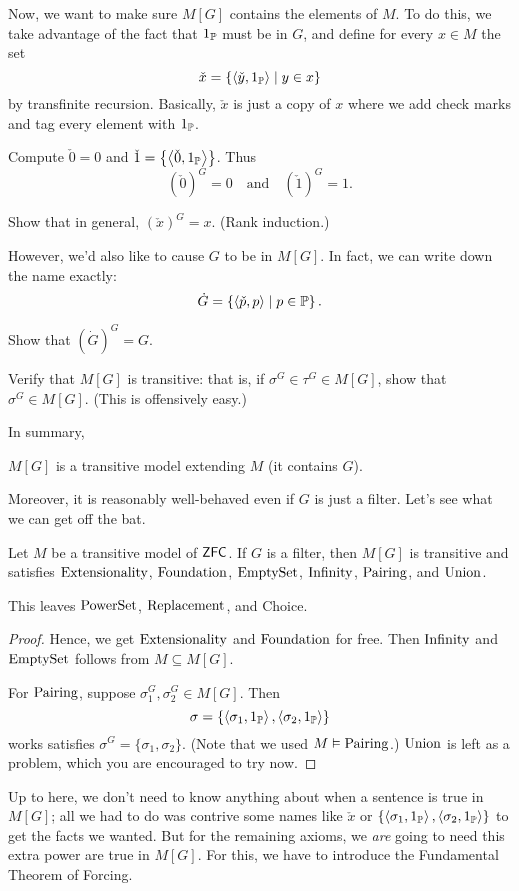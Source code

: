 Now, we want to make sure $M[G]$ contains the elements of $M$.
To do this, we take advantage of the fact that $1_\mathbb P$ must be in $G$, and define
for every $x \in M$ the set
\[ \check x = \left\{ \left<\check y, 1_\mathbb P\right> \mid y \in x \right\} \]
by transfinite recursion.
Basically, $\check x$ is just a copy of $x$ where we add check marks and tag every element with $1_\mathbb P$.

\begin{example}
	Compute $\check 0 = 0$ and $\check 1 = \left\{ \left<\check 0, 1_\mathbb P\right> \right\}$.
	Thus \[ (\check 0)^G = 0 \quad\text{and}\quad (\check 1)^G = 1. \]
\end{example}
\begin{ques}
	Show that in general, $(\check x)^G = x$.
	(Rank induction.)
\end{ques}

However, we'd also like to cause $G$ to be in $M[G]$.
In fact, we can write down the name exactly:
\[ \dot G = \left\{ \left<\check p, p\right> \mid p \in \mathbb P \right\}. \]
\begin{ques}
	Show that $(\dot G)^G = G$.
\end{ques}
\begin{ques}
	Verify that $M[G]$ is transitive:
	that is, if $\sigma^G \in \tau^G \in M[G]$, show that $\sigma^G \in M[G]$.
	(This is offensively easy.)
\end{ques}

In summary,
\begin{moral}
	$M[G]$ is a transitive model extending $M$ (it contains $G$).
\end{moral}

Moreover, it is reasonably well-behaved even if $G$ is just a filter.
Let's see what we can get off the bat.
\begin{lemma}
	Let $M$ be a transitive model of $\mathsf{ZFC}$.
	If $G$ is a filter, then $M[G]$ is transitive
	and satisfies $\mathrm{Extensionality}$, $\mathrm{Foundation}$, 
	$\mathrm{EmptySet}$, $\mathrm{Infinity}$, $\mathrm{Pairing}$, and $\mathrm{Union}$.
\end{lemma}

This leaves $\mathrm{PowerSet}$, $\mathrm{Replacement}$, and Choice.
\begin{proof}
	Hence, we get $\mathrm{Extensionality}$ and $\mathrm{Foundation}$ for free.
	Then $\mathrm{Infinity}$ and $\mathrm{EmptySet}$ follows from $M \subseteq M[G]$.

	For $\mathrm{Pairing}$, suppose $\sigma_1^G, \sigma_2^G \in M[G]$.
	Then
	\[ \sigma = 
		\left\{ \left<\sigma_1, 1_\mathbb P\right>, \left<\sigma_2, 1_\mathbb P\right> \right\}
	\]
	works satisfies $\sigma^G = \{\sigma_1, \sigma_2\}$.
	(Note that we used $M \vDash \mathrm{Pairing}$.)
	$\mathrm{Union}$ is left as a problem, which you are encouraged to try now.
\end{proof}
Up to here, we don't need to know anything about when a sentence is true in $M[G]$;
all we had to do was contrive some names like $\check x$ or
$\left\{ \left<\sigma_1, 1_\mathbb P\right>, \left<\sigma_2, 1_\mathbb P\right> \right\}$
to get the facts we wanted.
But for the remaining axioms, we \emph{are} going to need this extra power
are true in $M[G]$.
For this, we have to introduce the Fundamental Theorem of Forcing.

